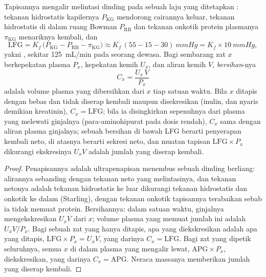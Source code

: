 \begin{theorem}\label{thm:b3:renal-osmoregulation:clearance}
%
Tapisannya mengalir melintasi dinding  pada sebuah laju yang ditetapkan
\emph{}: tekanan hidrostatis kapilernya
$P_{\text{KG}}$ mendorong cairannya keluar, tekanan hidrostatis di dalam ruang
Bowman $P_{\text{RB}}$ dan tekanan onkotik protein plasmanya
$\pi_{\text{KG}}$ menariknya kembali, dan
\[
\text{LFG} = K_{f}\,\bigl(P_{\text{KG}} - P_{\text{RB}} - \pi_{\text{KG}}\bigr)
\approx K_{f}\,(55 - 15 - 30)\ \unit{mmHg} = K_{f}\times \qty{10}{mmHg},
\]
yakni \emph{}, sekitar \qty{125}{mL/min} pada seorang
dewasa. Bagi sembarang zat $x$ berkepekatan plasma $P_{x}$, kepekatan
kemih $U_{x}$, dan aliran kemih $V$, \emph{bersihan}-nya
\[
C_{x} = \frac{U_{x}\,V}{P_{x}}
\]
adalah volume plasma yang dibersihkan dari $x$ tiap satuan waktu. Bila $x$ ditapis
dengan bebas dan tidak diserap kembali maupun disekresikan (inulin, dan nyaris demikian
kreatinin), $C_{x} = \text{LFG}$; bila ia disingkirkan sepenuhnya dari
plasma yang melewati ginjalnya (para-aminohipurat pada dosis rendah), $C_{x}$
sama dengan aliran plasma ginjalnya; sebuah bersihan di bawah LFG berarti penyerapan
kembali neto, di atasnya berarti sekresi neto, dan muatan tapisan $\text{LFG}
\times P_{x}$ dikurangi ekskresinya $U_{x}V$ adalah jumlah yang diserap kembali.
\end{theorem}
\begin{proof}
Penapisannya adalah ultrapenapisan menembus sebuah dinding berliang: alirannya
sebanding dengan tekanan neto yang melintasinya, dan tekanan netonya adalah
tekanan hidrostatis ke luar dikurangi tekanan hidrostatis dan onkotik ke
dalam (Starling), dengan tekanan onkotik tapisannya
terabaikan sebab ia tidak memuat protein. Bersihannya: dalam satuan waktu,
ginjalnya mengekskresikan $U_{x}V$ dari $x$; volume plasma yang memuat jumlah
ini adalah $U_{x}V/P_{x}$. Bagi sebuah zat yang hanya ditapis, apa
yang diekskresikan adalah apa yang ditapis, $\text{LFG}\times P_{x} = U_{x}V$,
yang darinya $C_{x} = \text{LFG}$. Bagi zat yang dipetik seluruhnya, semua $x$ di dalam
plasma yang mengalir lewat, $\text{APG}\times P_{x}$, diekskresikan,
yang darinya $C_{x} = \text{APG}$. Neraca massanya memberikan jumlah yang diserap kembali.
\end{proof}

